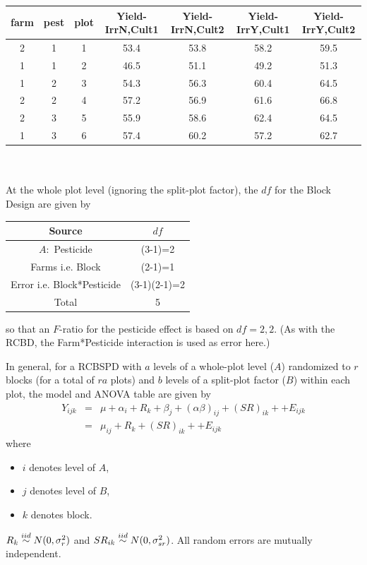 \begin{center}
\begin{tabular}{ccccccc}
farm & pest &   plot &    Yield-IrrN,Cult1 &    Yield-IrrN,Cult2 &     Yield-IrrY,Cult1 &     Yield-IrrY,Cult2\\\hline
 2&       1 &      1 &    53.4 &   53.8 &   58.2 &   59.5\\
 1&       1 &      2 &    46.5 &   51.1 &   49.2 &   51.3\\
 1&       2 &      3 &    54.3 &   56.3 &   60.4 &   64.5\\
 2&       2 &      4 &    57.2 &   56.9 &   61.6 &   66.8	\\
 2&       3 &      5 &    55.9 &   58.6 &   62.4 &   64.5\\
 1&       3 &      6 &    57.4 &   60.2 &   57.2 &   62.7\\
\end{tabular}
\end{center}
~\\~\\
At the whole plot level (ignoring the split-plot factor), the $df$ for the Block Design are given by
\begin{center}
\begin{tabular}{cc}
Source & $df$ \\ \hline
$A:$ Pesticide & (3-1)=2 \\
Farms i.e. Block& (2-1)=1 \\
Error i.e. Block*Pesticide&  (3-1)(2-1)=2\\
Total & 5 \\ \hline
\end{tabular}
\end{center}
so that an $F$-ratio for the pesticide effect is based on $df=2,2$.  (As with the RCBD, the Farm*Pesticide interaction is used as error here.)

\newpage

In general, for a RCBSPD with $a$ levels of a whole-plot level ($A$) randomized to $r$ blocks (for a total of $ra$ plots) and $b$ levels of 
a split-plot factor ($B$) within each plot, the model and ANOVA table are given by
\begin{eqnarray*}
Y_{ijk} &=& \mu + \alpha_i + R_k + \beta_j + (\alpha\beta)_{ij} + (SR)_{ik} ++ E_{ijk} \\
&=& \mu_{ij} + R_k + (SR)_{ik} ++ E_{ijk} 
\end{eqnarray*}
where 
\begin{itemize}
\item $i$ denotes level of $A$, 
\item $j$ denotes level of $B$,
\item $k$ denotes block.
\end{itemize}
$R_k \stackrel{iid}{\sim} N(0,\sigma^2_r)$ and $SR_{ik} \stackrel{iid}{\sim} N(0,\sigma^2_{sr})$. 
All random errors are mutually independent.\\

